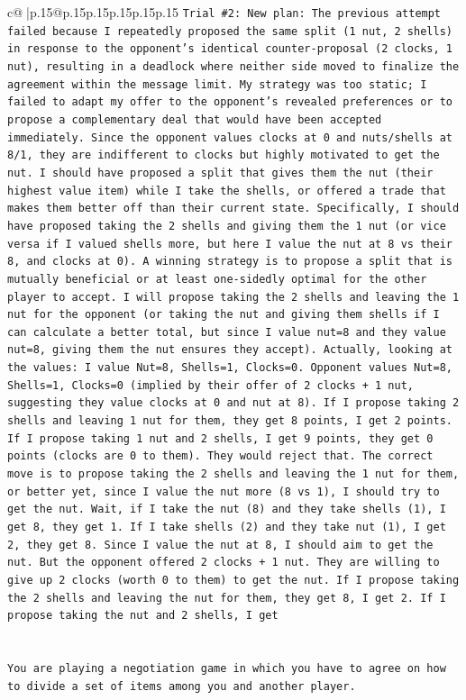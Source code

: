\documentclass{article}
\begin{document}
{\begin{supertabular}{c@{$\;$}|p{.15\linewidth}@{}p{.15\linewidth}p{.15\linewidth}p{.15\linewidth}p{.15\linewidth}p{.15\linewidth}}
{{{\texttt{Trial \#2: New plan: The previous attempt failed because I repeatedly proposed the same split (1 nut, 2 shells) in response to the opponent's identical counter{-}proposal (2 clocks, 1 nut), resulting in a deadlock where neither side moved to finalize the agreement within the message limit. My strategy was too static; I failed to adapt my offer to the opponent's revealed preferences or to propose a complementary deal that would have been accepted immediately. Since the opponent values clocks at 0 and nuts/shells at 8/1, they are indifferent to clocks but highly motivated to get the nut. I should have proposed a split that gives them the nut (their highest value item) while I take the shells, or offered a trade that makes them better off than their current state. Specifically, I should have proposed taking the 2 shells and giving them the 1 nut (or vice versa if I valued shells more, but here I value the nut at 8 vs their 8, and clocks at 0). A winning strategy is to propose a split that is mutually beneficial or at least one{-}sidedly optimal for the other player to accept. I will propose taking the 2 shells and leaving the 1 nut for the opponent (or taking the nut and giving them shells if I can calculate a better total, but since I value nut=8 and they value nut=8, giving them the nut ensures they accept). Actually, looking at the values: I value Nut=8, Shells=1, Clocks=0. Opponent values Nut=8, Shells=1, Clocks=0 (implied by their offer of 2 clocks + 1 nut, suggesting they value clocks at 0 and nut at 8). If I propose taking 2 shells and leaving 1 nut for them, they get 8 points, I get 2 points. If I propose taking 1 nut and 2 shells, I get 9 points, they get 0 points (clocks are 0 to them). They would reject that. The correct move is to propose taking the 2 shells and leaving the 1 nut for them, or better yet, since I value the nut more (8 vs 1), I should try to get the nut. Wait, if I take the nut (8) and they take shells (1), I get 8, they get 1. If I take shells (2) and they take nut (1), I get 2, they get 8. Since I value the nut at 8, I should aim to get the nut. But the opponent offered 2 clocks + 1 nut. They are willing to give up 2 clocks (worth 0 to them) to get the nut. If I propose taking the 2 shells and leaving the nut for them, they get 8, I get 2. If I propose taking the nut and 2 shells, I get} \\
\\ 
\\ 
\texttt{You are playing a negotiation game in which you have to agree on how to divide a set of items among you and another player.} \\
}}}
\end{supertabular}}
\end{document}
